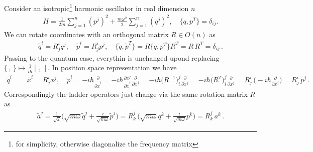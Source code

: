 \documentclass[../QFT_main.tex]{subfiles}
\begin{document}
\begin{mytheorem}
%
Consider an isotropic\footnote{\label{fn:isotropic_oscillator}for simplicity, otherwise diagonalize the frequency matrix} harmonic oscillator in real dimension $n$
\begin{align}
    H = \frac{1}{2m} \sum_{j=1}^n (p^j)^2 + \frac{m\omega^2}{2} \sum_{j=1}^n (q^j)^2, \quad \{q, p^T\} = \delta_{ij}.
\end{align}
We can rotate coordinates with an orthogonal matrix $R \in O(n)$ as   
\begin{align}
     \tilde{q}^i = R^i_{j} q^j, \quad \tilde{p}^i = R^i_{j} p^j, \quad 
     \{\tilde{q}, \tilde{p}^T\} = R\{q,p^T\} R^T = R\,R^T = \delta_{ij}\,.
\end{align}
Passing to the quantum case, everythin is unchanged upond replacing $\{\,,\,\}\mapsto \frac{1}{i\hbar} [\,,\,]$.
In position space representation we have
{\small
\begin{align}
    \tilde{q}^i &= \tilde{x}^i = R^i_{j} x^j, \quad \tilde{p}^i = -i\hbar \frac{\partial}{\partial \tilde{x}^i} = -i\hbar \frac{\partial x^j}{\partial \tilde{x}^i}\frac{\partial}{\partial x^j}
    = -i\hbar \big(R^{-1})^j_i  \frac{\partial}{\partial x^j} = - i\hbar \big(R^T)^j_i \frac{\partial}{\partial x^j} = R^i_{j}\,\Big(-i\hbar \frac{\partial}{\partial x^j} \Big) = R^i_{j}\, p^j\,.
\end{align}
}
Correspondingly the ladder operators just change via the same rotation matrix $R$ as
\begin{align}
    \tilde{a}^j = \frac{1}{\sqrt{2}}\Big(\sqrt{m\omega}\tilde{q}^j+\frac{i}{\sqrt{m\omega}}\tilde{p}^j\Big)
    = R^j_k\,\Big(\sqrt{m\omega}{q}^k+\frac{i}{\sqrt{m\omega}}{p}^k\Big) = R^j_k\, a^k\,.
\end{align}
\end{mytheorem}
\end{document}

